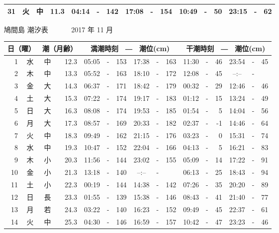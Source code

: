 \documentclass[12pt.a4j]{jsarticle}
\begin{document}
\begin{center}
\begin{table}[ht]
\begin{tabular}{|rc|cr|ccrccr|ccrccr|}
31 & 火 & 中 & 11.3 &  04:14 &-& 142  &  17:08 &-& 154  &   10:49 &-&  50  &   23:15 &-&  62  \\
   \hline
   \end{tabular}
\end{table}
\newpage
 {\LARGE 鳩間島  潮汐表　　　}
 {\large 2017 年 11 月}\\
 \begin{table}[ht]
    \begin{tabular}{|rc|cr|ccrccr|ccrccr|}
    \hline
    \multicolumn{2}{|c|}{日（曜）} & \multicolumn{2}{c|}{潮（月齢）} & \multicolumn{6}{c|}{満潮時刻　―　潮位(cm)} & \multicolumn{6}{c|}{干潮時刻　―　潮位(cm)} \\
 \hline
 1 & 水 & 中 & 12.3 &  05:05 &-& 153  &  17:38 &-& 163  &   11:30 &-&  46  &   23:54 &-&  45  \\
 2 & 木 & 中 & 13.3 &  05:52 &-& 163  &  18:10 &-& 172  &   12:08 &-&  45  &   --:-- &-&     \\
 3 & 金 & 大 & 14.3 &  06:37 &-& 171  &  18:42 &-& 179  &   00:32 &-&  29  &   12:46 &-&  46  \\
 4 & 土 & 大 & 15.3 &  07:22 &-& 174  &  19:17 &-& 183  &   01:12 &-&  15  &   13:24 &-&  49  \\
 5 & 日 & 大 & 16.3 &  08:08 &-& 174  &  19:53 &-& 185  &   01:54 &-&   5  &   14:04 &-&  56  \\
 6 & 月 & 大 & 17.3 &  08:57 &-& 169  &  20:33 &-& 182  &   02:37 &-&  -1  &   14:46 &-&  64  \\
 7 & 火 & 中 & 18.3 &  09:49 &-& 162  &  21:15 &-& 176  &   03:23 &-&   0  &   15:31 &-&  74  \\
 8 & 水 & 中 & 19.3 &  10:47 &-& 152  &  22:04 &-& 166  &   04:13 &-&   5  &   16:21 &-&  83  \\
 9 & 木 & 小 & 20.3 &  11:56 &-& 144  &  23:02 &-& 155  &   05:09 &-&  14  &   17:22 &-&  91  \\
10 & 金 & 小 & 21.3 &  13:18 &-& 140  &  --:-- &-&     &   06:13 &-&  25  &   18:43 &-&  94  \\
11 & 土 & 小 & 22.3 &  00:19 &-& 144  &  14:38 &-& 142  &   07:26 &-&  35  &   20:20 &-&  89  \\
12 & 日 & 長 & 23.3 &  01:55 &-& 139  &  15:38 &-& 146  &   08:43 &-&  41  &   21:40 &-&  77  \\
13 & 月 & 若 & 24.3 &  03:22 &-& 140  &  16:23 &-& 152  &   09:49 &-&  45  &   22:37 &-&  61  \\
14 & 火 & 中 & 25.3 &  04:30 &-& 146  &  16:59 &-& 157  &   10:42 &-&  47  &   23:23 &-&  46  \\

\end{tabular}
\end{table}
\end{center}
\end{document}
